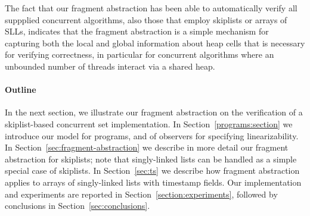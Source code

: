 The fact that our fragment abstraction has been able to automatically verify all
suppplied concurrent algorithms, also those that employ skiplists or
arrays of SLLs, indicates that the fragment abstraction is a simple
mechanism for capturing both the local and global information about heap cells
that is necessary for verifying correctness, in particular for
concurrent algorithms where an unbounded number of threads interact
via a shared heap.

\paragraph{Outline}
In the next section, we illustrate our fragment abstraction on the
verification of a skiplist-based concurrent set implementation.
In Section~\ref{programs:section} we introduce our model for programs,
and of observers for specifying linearizability. In 
Section~\ref{sec:fragment-abstraction} we describe in more detail our
fragment abstraction for skiplists; note that singly-linked lists can
be handled as a simple special case of skiplists.
In Section~\ref{sec:ts} we describe how fragment abstraction applies to
arrays of singly-linked lists with timestamp fields.
Our implementation and
experiments are reported in Section~\ref{section:experiments}, followed
by conclusions in Section~\ref{sec:conclusions}.





